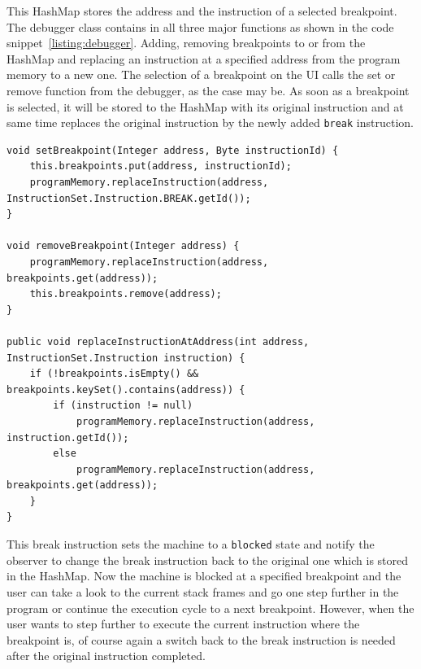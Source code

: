 This HashMap stores the address and the instruction of a selected breakpoint. The debugger class contains in all three major functions as shown in the code snippet~\ref{listing:debugger}. Adding, removing breakpoints to or from the HashMap and replacing an instruction at a specified address from the program memory to a new one. The selection of a breakpoint on the UI calls the set or remove function from the debugger, as the case may be. As soon as a breakpoint is selected, it will be stored to the HashMap with its original instruction and at same time replaces the original instruction by the newly added \lstinline$break$ instruction.
\begin{lstlisting}[caption={Implementation of the debugger},label=listing:debugger]
void setBreakpoint(Integer address, Byte instructionId) {
    this.breakpoints.put(address, instructionId);
    programMemory.replaceInstruction(address, InstructionSet.Instruction.BREAK.getId());
}

void removeBreakpoint(Integer address) {
    programMemory.replaceInstruction(address, breakpoints.get(address));
    this.breakpoints.remove(address);
}

public void replaceInstructionAtAddress(int address, InstructionSet.Instruction instruction) {
    if (!breakpoints.isEmpty() && breakpoints.keySet().contains(address)) {
        if (instruction != null)
            programMemory.replaceInstruction(address, instruction.getId());
        else
            programMemory.replaceInstruction(address, breakpoints.get(address));
    }
}
\end{lstlisting}
This break instruction sets the machine to a \lstinline$blocked$ state and notify the observer to change the break instruction back to the original one which is stored in the HashMap. Now the machine is blocked at a specified breakpoint and the user can take a look to the current stack frames and go one step further in the program or continue the execution cycle to a next breakpoint. However, when the user wants to step further to execute the current instruction where the breakpoint is, of course again a switch back to the break instruction is needed after the original instruction completed.  
